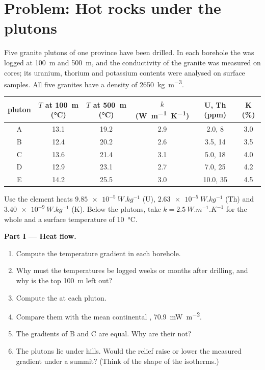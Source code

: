 \section{Problem: Hot rocks under the plutons}

\begin{problem}
\label{pb:b1:heat-budget:1}
Five granite plutons of one province have been drilled. In each borehole the
 was logged at \qty{100}{m} and \qty{500}{m}, and the
conductivity of the granite was measured on cores; its uranium, thorium and
potassium contents were analysed on surface samples. All five granites have a
density of \qty{2650}{kg.m^{-3}}.
\begin{center}
\small
\begin{tabular}{cccccc}
\hline
pluton & $T$ at \qty{100}{m} (\unit{\degreeCelsius}) & $T$ at \qty{500}{m} (\unit{\degreeCelsius}) & $k$ (\unit{W.m^{-1}.K^{-1}}) & U, Th (ppm) & K (\unit{\percent}) \\
\hline
A & 13.1 & 19.2 & 2.9 & 2.0, 8 & 3.0 \\
B & 12.4 & 20.2 & 2.6 & 3.5, 14 & 3.5 \\
C & 13.6 & 21.4 & 3.1 & 5.0, 18 & 4.0 \\
D & 12.9 & 23.1 & 2.7 & 7.0, 25 & 4.2 \\
E & 14.2 & 25.5 & 3.0 & 10.0, 35 & 4.5 \\
\hline
\end{tabular}
\end{center}
Use the element heats $\qty{9.85e-5}{W.kg^{-1}}$ (U), $\qty{2.63e-5}{W.kg^{-1}}$
(Th) and $\qty{3.40e-9}{W.kg^{-1}}$ (K). Below the plutons, take
$k = \qty{2.5}{W.m^{-1}.K^{-1}}$ for the whole  and a surface temperature of
\qty{10}{\degreeCelsius}.

\medskip
\noindent\textbf{Part I --- Heat flow.}
\begin{enumerate}
  \item Compute the temperature gradient in each borehole.
  \item Why must the temperatures be logged weeks or months after drilling, and
        why is the top \qty{100}{m} left out?
  \item Compute the  at each pluton.
  \item Compare them with the mean continental , \qty{70.9}{mW.m^{-2}}.
  \item The gradients of B and C are equal. Why are their  not?
  \item The plutons lie under hills. Would the relief raise or lower the
        measured gradient under a summit? (Think of the shape of the isotherms.)
\end{enumerate}


\end{problem}

